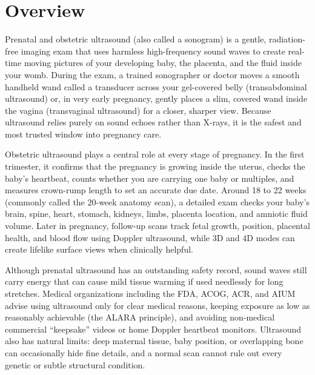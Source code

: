 \label{ch:infographic-obstetric-ultrasound}

\section{Overview}

Prenatal and obstetric ultrasound (also called a sonogram) is a gentle, radiation-free imaging exam that uses harmless high-frequency sound waves to create real-time moving pictures of your developing baby, the placenta, and the fluid inside your womb. During the exam, a trained sonographer or doctor moves a smooth handheld wand called a transducer across your gel-covered belly (transabdominal ultrasound) or, in very early pregnancy, gently places a slim, covered wand inside the vagina (transvaginal ultrasound) for a closer, sharper view. Because ultrasound relies purely on sound echoes rather than X-rays, it is the safest and most trusted window into pregnancy care.

Obstetric ultrasound plays a central role at every stage of pregnancy. In the first trimester, it confirms that the pregnancy is growing inside the uterus, checks the baby's heartbeat, counts whether you are carrying one baby or multiples, and measures crown-rump length to set an accurate due date. Around 18 to 22 weeks (commonly called the 20-week anatomy scan), a detailed exam checks your baby's brain, spine, heart, stomach, kidneys, limbs, placenta location, and amniotic fluid volume. Later in pregnancy, follow-up scans track fetal growth, position, placental health, and blood flow using Doppler ultrasound, while 3D and 4D modes can create lifelike surface views when clinically helpful.

Although prenatal ultrasound has an outstanding safety record, sound waves still carry energy that can cause mild tissue warming if used needlessly for long stretches. Medical organizations including the FDA, ACOG, ACR, and AIUM advise using ultrasound only for clear medical reasons, keeping exposure as low as reasonably achievable (the ALARA principle), and avoiding non-medical commercial ``keepsake'' videos or home Doppler heartbeat monitors. Ultrasound also has natural limits: deep maternal tissue, baby position, or overlapping bone can occasionally hide fine details, and a normal scan cannot rule out every genetic or subtle structural condition.

